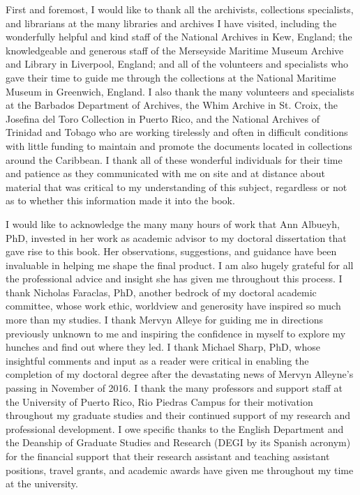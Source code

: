 \addchap{\lsAcknowledgementTitle}
First and foremost, I would like to thank all the archivists, collections specialists, and librarians at the many libraries and archives I have visited, including the wonderfully helpful and kind staff of the National Archives in Kew, England; the knowledgeable and generous staff of the Merseyside Maritime Museum Archive and Library in Liverpool, England; and all of the volunteers and specialists who gave their time to guide me through the collections at the National Maritime Museum in Greenwich, England. I also thank the many volunteers and specialists at the Barbados Department of Archives, the Whim Archive in St. Croix, the Josefina del Toro Collection in Puerto Rico, and the National Archives of Trinidad and Tobago who are working tirelessly and often in difficult conditions with little funding to maintain and promote the documents located in collections around the Caribbean. I thank all of these wonderful individuals for their time and patience as they communicated with me on site and at distance about material that was critical to my understanding of this subject, regardless or not as to whether this information made it into the book. 

I would like to acknowledge the many many hours of work that Ann Albueyh, PhD, invested in her work as academic advisor to my doctoral dissertation that gave rise to this book. Her observations, suggestions, and guidance have been invaluable in helping me shape the final product. I am also hugely grateful for all the professional advice and insight she has given me throughout this process. I thank Nicholas Faraclas, PhD, another bedrock of my doctoral academic committee, whose work ethic, worldview and generosity have inspired so much more than my studies. I thank Mervyn Alleye for guiding me in directions previously unknown to me and inspiring the confidence in myself to explore my hunches and find out where they led. I thank Michael Sharp, PhD, whose insightful comments and input as a reader were critical in enabling the completion of my doctoral degree after the devastating news of Mervyn Alleyne’s passing in November of 2016. I thank the many professors and support staff at the University of Puerto Rico, Rio Piedras Campus for their motivation throughout my graduate studies and their continued support of my research and professional development. I owe specific thanks to the English Department and the Deanship of Graduate Studies and Research (DEGI by its Spanish acronym) for the financial support that their research assistant and teaching assistant positions, travel grants, and academic awards have given me throughout my time at the university.

